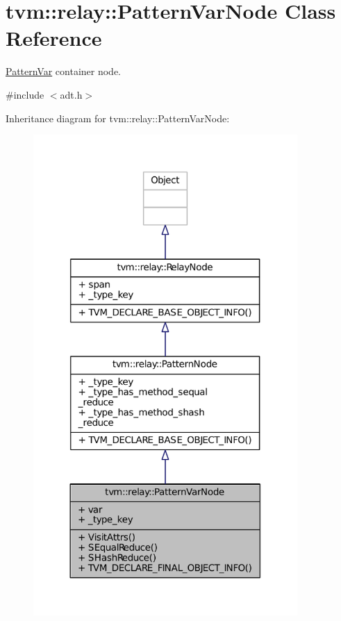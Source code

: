 \hypertarget{classtvm_1_1relay_1_1PatternVarNode}{}\section{tvm\+:\+:relay\+:\+:Pattern\+Var\+Node Class Reference}
\label{classtvm_1_1relay_1_1PatternVarNode}


\hyperlink{classtvm_1_1relay_1_1PatternVar}{Pattern\+Var} container node.  




{\ttfamily \#include $<$adt.\+h$>$}



Inheritance diagram for tvm\+:\+:relay\+:\+:Pattern\+Var\+Node\+:
\nopagebreak
\begin{figure}[H]
\begin{center}
\leavevmode
\includegraphics[width=285pt]{classtvm_1_1relay_1_1PatternVarNode__inherit__graph}
\end{center}
\end{figure}


